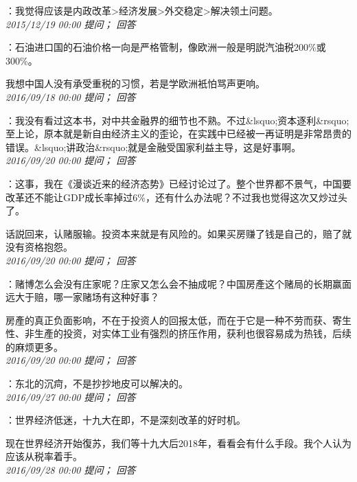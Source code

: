 \documentclass[twocolumn]{ctexart}
\begin{document}
：我觉得应该是内政改革>经济发展>外交稳定>解决领土问题。\\

\textit{\hfill\noindent\small 2015/12/19 00:00 提问； 回答}

：石油进口国的石油价格一向是严格管制，像欧洲一般是明説汽油税200\%或300\%。

我想中国人没有承受重税的习惯，若是学欧洲衹怕骂声更响。\\

\textit{\hfill\noindent\small 2016/09/18 00:00 提问； 回答}

：我没有看过这本书，对中共金融界的细节也不熟。不过\&lsquo;资本逐利\&rsquo;至上论，原本就是新自由经济主义的歪论，在实践中已经被一再证明是非常昂贵的错误。\&lsquo;讲政治\&rsquo;就是金融受国家利益主导，这是好事啊。\\

\textit{\hfill\noindent\small 2016/09/20 00:00 提问； 回答}

：这事，我在《漫谈近来的经济态势》已经讨论过了。整个世界都不景气，中国要改革还不能让GDP成长率掉过6\%，还有什么办法呢？不过我也觉得这次又炒过头了。

话説回来，认赌服输。投资本来就是有风险的。如果买房赚了钱是自己的，赔了就没有资格抱怨。\\

\textit{\hfill\noindent\small 2016/09/20 00:00 提问； 回答}

：赌博怎么会没有庄家呢？庄家又怎么会不抽成呢？中国房產这个赌局的长期赢面远大于赔，哪一家赌场有这种好事？

房產的真正负面影响，不在于投资人的回报太低，而在于它是一种不劳而获、寄生性、非生產的投资，对实体工业有强烈的挤压作用，获利也很容易成为热钱，后续的麻烦更多。\\

\textit{\hfill\noindent\small 2016/09/20 00:00 提问； 回答}

：东北的沉疴，不是抄抄地皮可以解决的。\\

\textit{\hfill\noindent\small 2016/09/27 00:00 提问； 回答}

：世界经济低迷，十九大在即，不是深刻改革的好时机。

现在世界经济开始復苏，我们等十九大后2018年，看看会有什么手段。我个人认为应该从税率着手。\\

\textit{\hfill\noindent\small 2016/09/28 00:00 提问； 回答}
\end{document}
